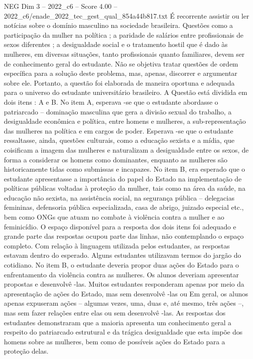 \begin{textsample}{NEG Dim 3 – 2022\_c6 – Score 4.00 – 2022\_c6/enade\_2022\_tec\_gest\_qual\_854a44b817.txt}
É recorrente assistir ou ler notícias sobre o domínio masculino na sociedade brasileira.
Questões como a participação da mulher na política ; a paridade de salários entre profissionais de sexos diferentes ; a desigualdade social e o tratamento hostil que é dado às mulheres, em diversas situações, tanto profissionais quanto familiares, devem ser de conhecimento geral do estudante.
Não se objetiva tratar questões de ordem específica para a solução deste problema, mas, apenas, discorrer e argumentar sobre ele.
Portanto, a questão foi elaborada de maneira oportuna e adequada para o universo do estudante universitário brasileiro.
A Questão está dividida em dois itens : A e B.
No item A, esperava -se que o estudante abordasse o patriarcado – dominação masculina que gera a divisão sexual do trabalho, a desigualdade econômica e política, entre homens e mulheres, a sub-representação das mulheres na política e em cargos de poder.
Esperava -se que o estudante ressaltasse, ainda, questões culturais, como a educação sexista e a mídia, que coisificam a imagem das mulheres e naturalizam a desigualdade entre os sexos, de forma a considerar os homens como dominantes, enquanto as mulheres são historicamente tidas como submissas e incapazes.
No item B, era esperado que o estudante apresentasse a importância do papel do Estado na implementação de políticas públicas voltadas à proteção da mulher, tais como na área da saúde, na educação não sexista, na assistência social, na segurança pública – delegacias femininas, defensoria pública especializada, casa de abrigo, juizado especial etc., bem como ONGs que atuam no combate à violência contra a mulher e ao feminicídio.
O espaço disponível para a resposta dos dois itens foi adequado e grande parte das respostas ocupou parte das linhas, não contemplando o espaço completo.
Com relação à linguagem utilizada pelos estudantes, as respostas estavam dentro do esperado.
Alguns estudantes utilizavam termos do jargão do cotidiano.
No item B, o estudante deveria propor duas ações do Estado para o enfrentamento da violência contra as mulheres.
Os alunos deveriam apresentar propostas e desenvolvê -las.
Muitos estudantes responderam apenas por meio da apresentação de ações do Estado, mas sem desenvolvê -las ou Em geral, os alunos apenas expuseram ações – algumas vezes, uma, duas e, até mesmo, três ações –, mas sem fazer relações entre elas ou sem desenvolvê -las.
As respostas dos estudantes demonstraram que a maioria apresenta um conhecimento geral a respeito do patriarcado estrutural e da trágica desigualdade que esta impõe dos homens sobre as mulheres, bem como de possíveis ações do Estado para a proteção delas.

\end{textsample}
